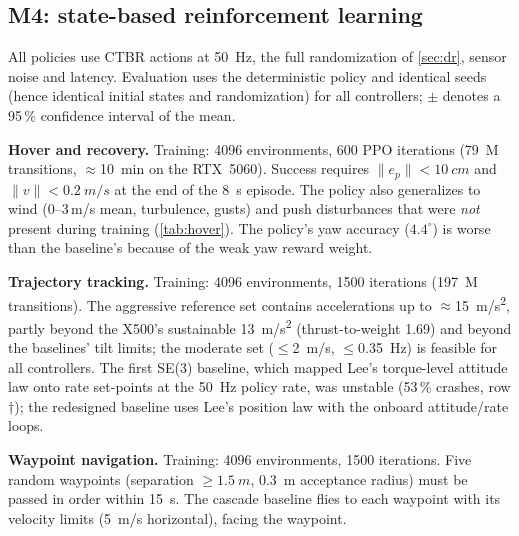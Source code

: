 \documentclass[11pt,a4paper]{article}
\begin{document}
\subsection{M4: state-based reinforcement learning}
All policies use CTBR actions at \SI{50}{Hz}, the full randomization of \cref{sec:dr}, sensor noise and latency.
Evaluation uses the deterministic policy and identical seeds (hence identical initial states and randomization) for all
controllers; $\pm$ denotes a 95\,\% confidence interval of the mean.

\textbf{Hover and recovery.} Training: 4096 environments, 600 PPO iterations (\SI{79}{M} transitions, $\approx$\SI{10}{min}
on the RTX~5060). Success requires $\|e_p\|<\SI{10}{cm}$ and $\|v\|<\SI{0.2}{m/s}$ at the end of the \SI{8}{s} episode.
The policy also generalizes to wind (0--3\,m/s mean, turbulence, gusts) and push disturbances that were \emph{not}
present during training (\cref{tab:hover}). The policy's yaw accuracy ($4.4^\circ$) is worse than the baseline's because of
the weak yaw reward weight.
\begin{table}[h]\centering\small
\resizebox{\linewidth}{!}{}
\caption{Hover/recovery from up to $57^\circ$ tilt, \SI{3}{rad/s}, \SI{1.5}{m/s} and \SI{1.5}{m} offset (1000 episodes per row).}
\label{tab:hover}
\end{table}

\textbf{Trajectory tracking.} Training: 4096 environments, 1500 iterations (\SI{197}{M} transitions). The aggressive
reference set contains accelerations up to $\approx$\SI{15}{m/s^2}, partly beyond the X500's sustainable
\SI{13}{m/s^2} (thrust-to-weight 1.69) and beyond the baselines' tilt limits; the moderate set ($\le$\SI{2}{m/s},
$\le$\SI{0.35}{Hz}) is feasible for all controllers. The first SE(3) baseline, which mapped Lee's torque-level attitude
law onto rate set-points at the \SI{50}{Hz} policy rate, was unstable (53\,\% crashes, row $\dagger$); the redesigned
baseline uses Lee's position law with the onboard attitude/rate loops.
\begin{table}[h]\centering\small
\resizebox{\linewidth}{!}{}
\caption{Trajectory tracking (500 episodes of \SI{10}{s} per row). Maximum errors include the initial transient
(start offset up to \SI{0.3}{m}).}
\label{tab:track}
\end{table}

\textbf{Waypoint navigation.} Training: 4096 environments, 1500 iterations. Five random waypoints (separation
$\ge\SI{1.5}{m}$, \SI{0.3}{m} acceptance radius) must be passed in order within \SI{15}{s}. The cascade baseline
flies to each waypoint with its velocity limits (\SI{5}{m/s} horizontal), facing the waypoint.
\begin{table}[h]\centering\small
\resizebox{\linewidth}{!}{}
\caption{Waypoint navigation (500 episodes). Time is measured over successful episodes only.}
\label{tab:wp}
\end{table}
\end{document}
